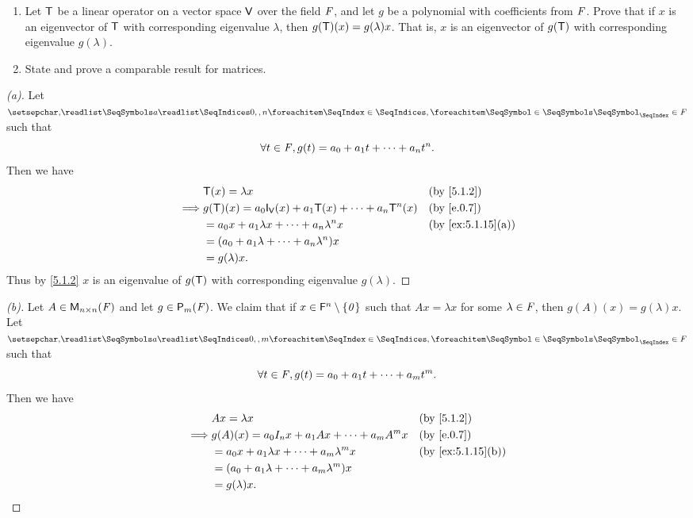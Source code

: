 \begin{ex}\label{ex:5.1.22}
  \begin{enumerate}
    \item Let \(\mathsf{T}\) be a linear operator on a vector space \(\mathsf{V}\) over the field \(\mathit{F}\), and let \(g\) be a polynomial with coefficients from \(\mathit{F}\).
          Prove that if \(x\) is an eigenvector of \(\mathsf{T}\) with corresponding eigenvalue \(\lambda\), then \(g(\mathsf{T})(x) = g(\lambda) x\).
          That is, \(x\) is an eigenvector of \(g(\mathsf{T})\) with corresponding eigenvalue \(g(\lambda)\).
    \item State and prove a comparable result for matrices.
  \end{enumerate}
\end{ex}

\begin{proof}[(a)]
  Let \(\seq{a}{0,,n} \in \F\) such that
  \[
    \forall t \in \mathit{F}, g(t) = a_0 + a_1 t + \cdots + a_n t^n.
  \]
  Then we have
  \begin{align*}
             & \T(x) = \lambda x                                            &  & \text{(by \cref{5.1.2})}        \\
    \implies & g(\T)(x) = a_0 \IT[\V](x) + a_1 \T(x) + \cdots + a_n \T^n(x) &  & \text{(by \cref{e.0.7})}        \\
             & = a_0 x + a_1 \lambda x + \cdots + a_n \lambda^n x           &  & \text{(by \cref{ex:5.1.15}(a))} \\
             & = (a_0 + a_1 \lambda + \cdots + a_n \lambda^n) x                                                  \\
             & = g(\lambda) x.
  \end{align*}
  Thus by \cref{5.1.2} \(x\) is an eigenvalue of \(g(\mathsf{T})\) with corresponding eigenvalue \(g(\lambda)\).
\end{proof}

\begin{proof}[(b)]
  Let \(A \in \mathsf{M}_{{n} \times n}({\mathit{F}})\) and let \(g \in \ps[m]{\F}\).
  We claim that if \(x \in \mathsf{F}^n \setminus \left\lbrace\mathit{0}\right\rbrace\) such that \(Ax = \lambda x\) for some \(\lambda \in \mathit{F}\), then \(g(A)(x) = g(\lambda) x\).
  Let \(\seq{a}{0,,m} \in \F\) such that
  \[
    \forall t \in \mathit{F}, g(t) = a_0 + a_1 t + \cdots + a_m t^m.
  \]
  Then we have
  \begin{align*}
             & Ax = \lambda x                                     &  & \text{(by \cref{5.1.2})}        \\
    \implies & g(A)(x) = a_0 I_n x + a_1 A x + \cdots + a_m A^m x &  & \text{(by \cref{e.0.7})}        \\
             & = a_0 x + a_1 \lambda x + \cdots + a_m \lambda^m x &  & \text{(by \cref{ex:5.1.15}(b))} \\
             & = (a_0 + a_1 \lambda + \cdots + a_m \lambda^m) x                                        \\
             & = g(\lambda) x.
  \end{align*}
\end{proof}

